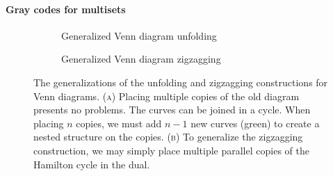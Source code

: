 \documentclass[fontsize=11pt,a4paper,DIV=12]{scrartcl}
\begin{document}
\paragraph{Gray codes for multisets}
\begin{figure}[htbp]
	\centering
	\begin{subfigure}[b]{0.48\textwidth}
		\centering
		
		\caption{Generalized Venn diagram unfolding}
		\label{fig:venn unfolding generalized}
	\end{subfigure}
	\hfill
	\begin{subfigure}[b]{0.48\textwidth}
		\centering
		
		\caption{Generalized Venn diagram zigzagging}
		\label{fig:venn zigzagging generalized}
	\end{subfigure}

	\caption{The generalizations of the unfolding and zigzagging constructions for Venn diagrams. (\textsc{a}) Placing multiple copies of the old diagram presents no problems. The curves can be joined in a cycle. When placing $n$ copies, we must add $n-1$ new curves (green) to create a nested structure on the copies. (\textsc{b}) To generalize the zigzagging construction, we may simply place multiple parallel copies of the Hamilton cycle in the dual.}
	\label{fig:combined venn generalized}
\end{figure}
\end{document}
